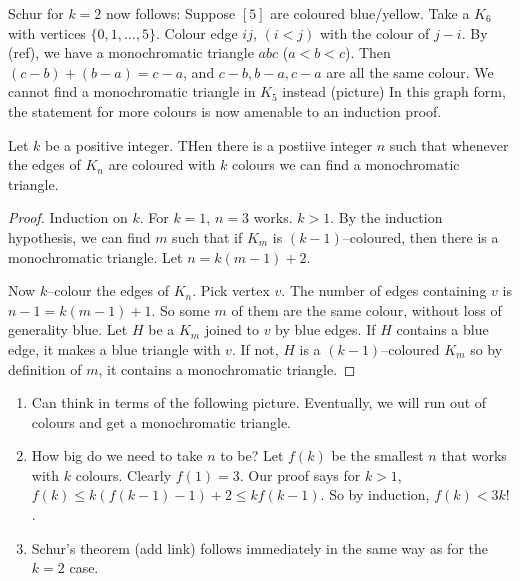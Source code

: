 \documentclass{article}
\begin{document}
\begin{remark}
    Schur for $k=2$ now follows: Suppose $[5]$ are coloured blue/yellow. Take a $K_6$ with vertices $\{0, 1, \dots, 5\}$. Colour edge $ij$, $(i<j)$ with the colour of $j-i$. By (ref), we have a monochromatic triangle $abc$ ($a<b<c$). Then $(c-b) + (b-a) = c-a$, and $c-b, b-a, c-a$ are all the same colour.
    We cannot find a monochromatic triangle in $K_5$ instead (picture)
    In this graph form, the statement for more colours is now amenable to an induction proof.
\end{remark}

\begin{nprop}
    Let $k$ be a positive integer. THen there is a postiive integer $n$ such that whenever the edges of $K_n$ are coloured with $k$ colours we can find a monochromatic triangle.
\end{nprop}

\begin{proof}
    Induction on $k$. For $k=1$, $n=3$ works.
    $k>1$. By the induction hypothesis, we can find $m$ such that if $K_m$ is $(k-1)$--coloured, then there is a monochromatic triangle.  Let $n = k(m-1) + 2$.

    Now $k$--colour the edges of $K_n$.  Pick vertex $v$.  The number of edges containing $v$ is $n-1 = k(m-1)+1$.  So some $m$ of them are the same colour, without loss of generality blue.  Let $H$ be a $K_m$ joined to $v$ by blue edges. If $H$ contains a blue edge, it makes a blue triangle with $v$. If not, $H$ is a $(k-1)$--coloured $K_m$ so by definition of $m$, it contains a monochromatic triangle.
\end{proof}

\begin{remark}
    \leavevmode
    \begin{enumerate}
        \item Can think in terms of the following picture. Eventually, we will run out of colours and get a monochromatic triangle.
        \item How big do we need to take $n$ to be?  Let $f(k)$ be the smallest $n$ that works with $k$ colours. Clearly $f(1) = 3$. Our proof says for $k>1$, $f(k) \leq k \left(f(k-1)-1\right) + 2 \leq k f(k-1)$.  So by induction, $f(k) < 3 k!$.
        \item Schur's theorem (add link) follows immediately in the same way as for the $k=2$ case.
    \end{enumerate}
\end{remark}
\end{document}
